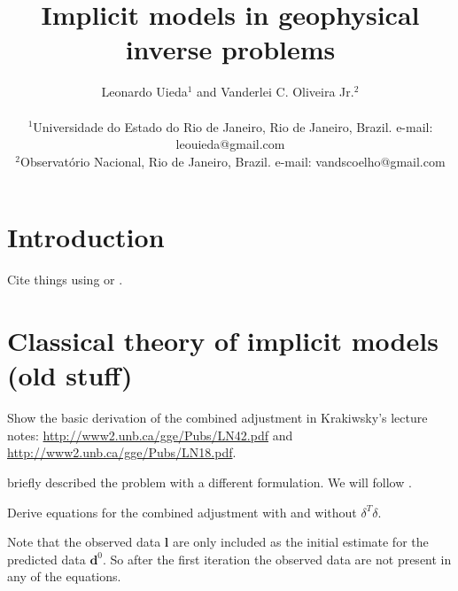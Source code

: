 \documentclass[onecolumn]{article}
\begin{document}
\title{Implicit models in geophysical inverse problems}
\author{
    Leonardo Uieda$^{1}$
    and
    Vanderlei C. Oliveira Jr.$^{2}$
    \\\\
    {\small $^1$Universidade do Estado do Rio de Janeiro, Rio de Janeiro, Brazil.
        e-mail: leouieda@gmail.com}
    \\
    {\small $^2$Observatório Nacional, Rio de Janeiro, Brazil.
        e-mail: vandscoelho@gmail.com}
}


\maketitle


\begin{abstract}
    \lipsum[1]
\end{abstract}


\section{Introduction}

Cite things using \citet{tikhonov1977} or \citep{tikhonov1977}.



\section{Classical theory of implicit models (old stuff)}

Show the basic derivation of the combined adjustment in Krakiwsky's lecture
notes:
\url{http://www2.unb.ca/gge/Pubs/LN42.pdf} and
\url{http://www2.unb.ca/gge/Pubs/LN18.pdf}.

\citet{menke2012} briefly described the problem with a different formulation.
We will follow \citet{vanicek1986}.

Derive equations for the combined adjustment with and without $\delta^T\delta$.

Note that the observed data $\mathbf{l}$
are only included
as the initial estimate
for the predicted data $\mathbf{d}^0$.
So after the first iteration
the observed data are not present
in any of the equations.
\end{document}
